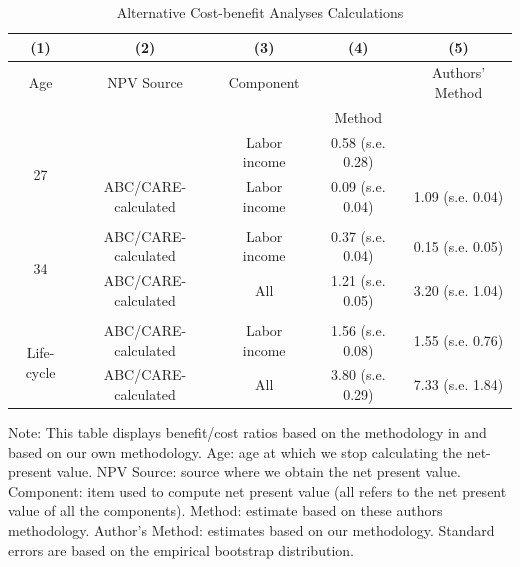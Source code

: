 \documentclass[static]{JJH-Beamer}
\newcommand{\mc}{\multicolumn}
\begin{document}
\begin{frame}

\begin{table}[H]
\caption{Alternative Cost-benefit Analyses Calculations}\label{table:comparing}
\begin{center}
\begin{spacing}{1.5}
\begin{tabular}{ccccc}
\toprule
(1) & (2) & (3) & (4) & (5)\\ \midrule
Age & \mc{1}{c}{NPV Source} & Component & \citet{Kline_Walters_2016_QJE} & Authors' Method \\
& & & Method & \\ \midrule
\multirow{2}{*}{27} & \cite{Chetty_Friedman_etal_2011_QJoE} & Labor income & 0.58 (s.e. 0.28) &  \\
& ABC/CARE-calculated & Labor income & 0.09 (s.e. 0.04) &  1.09 (s.e. 0.04)\\ \\
\multirow{2}{*}{34} & ABC/CARE-calculated & Labor income & 0.37 (s.e. 0.04) & 0.15 (s.e. 0.05) \\
& ABC/CARE-calculated & All & 1.21 (s.e. 0.05) &  3.20 (s.e. 1.04) \\ \\
\multirow{2}{*}{Life-cycle} &  ABC/CARE-calculated & Labor income & 1.56 (s.e. 0.08) & 1.55 (s.e. 0.76) \\
& ABC/CARE-calculated & All & 3.80 (s.e. 0.29) & 7.33 (s.e. 1.84) \\
\bottomrule
\end{tabular}
\end{spacing}
\end{center}
{\flushleft \tiny Note: This table displays benefit/cost ratios based on the methodology in \citet{Kline_Walters_2016_QJE} and based on our own methodology. Age: age at which we stop calculating the net-present value. NPV Source: source where we obtain the net present value. Component: item used to compute net present value (all refers to the net present value of all the components). \citet{Kline_Walters_2016_QJE} Method: estimate based on these authors methodology. Author's Method: estimates based on our methodology. Standard errors are based on the empirical bootstrap distribution.\\}
\end{table}

\end{frame}
\end{document}
